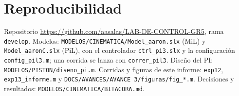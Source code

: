 \documentclass[conference]{IEEEtran}
\begin{document}
\appendix
\section*{Reproducibilidad}
\raggedright
Repositorio \url{https://github.com/aasalas/LAB-DE-CONTROL-GR5}, rama \texttt{develop}. Modelos: \texttt{MODELOS/CINEMATICA/Model\_aaron.slx} (MiL) y \texttt{Model\_aaronC.slx} (PiL), con el controlador \texttt{ctrl\_pi3.slx} y la configuración \texttt{config\_pil3.m}; una corrida se lanza con \texttt{correr\_pil3}. Diseño del PI: \texttt{MODELOS/PISTON/diseno\_pi.m}. Corridas y figuras de este informe: \texttt{exp12}, \texttt{exp13\_informe.m} y \texttt{DOCS/AVANCES/AVANCE 3/figuras/fig\_*.m}. Decisiones y resultados: \texttt{MODELOS/CINEMATICA/BITACORA.md}.
\end{document}
